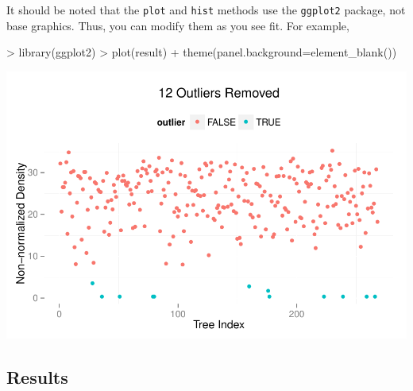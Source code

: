 \documentclass{article}
\begin{document}
It should be noted that the {\tt plot} and {\tt hist} methods use the
{\tt ggplot2} package, not base graphics. Thus, you can modify them as
you see fit. For example,
\begin{center}
\begin{Schunk}
\begin{Sinput}
> library(ggplot2)
> plot(result) + theme(panel.background=element_blank())
\end{Sinput}
\end{Schunk}
\includegraphics{kdetrees-008}
\end{center}

\subsection{Results}
\label{sec:results}
\end{document}
